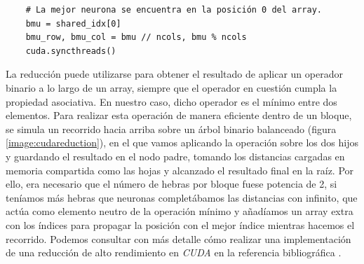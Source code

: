 \begin{code}
\begin{verbatim}
    # La mejor neurona se encuentra en la posición 0 del array.
    bmu = shared_idx[0]
    bmu_row, bmu_col = bmu // ncols, bmu % ncols
    cuda.syncthreads()
\end{verbatim}
\label{code:somiter2}
\end{code}
  
La reducción puede utilizarse para obtener el resultado de aplicar un operador binario a lo largo de un array, siempre que el operador en cuestión cumpla la propiedad asociativa. En nuestro caso, dicho operador es el mínimo entre dos elementos. Para realizar esta operación de manera eficiente dentro de un bloque, se simula un recorrido hacia arriba sobre un árbol binario balanceado (figura \ref{image:cudareduction}), en el que vamos aplicando la operación sobre los dos hijos y guardando el resultado en el nodo padre, tomando los distancias cargadas en memoria compartida como las hojas y alcanzado el resultado final en la raíz. Por ello, era necesario que el número de hebras por bloque fuese potencia de 2, si teníamos más hebras que neuronas completábamos las distancias con infinito, que actúa como elemento neutro de la operación mínimo y añadíamos un array extra con los índices para propagar la posición con el mejor índice mientras hacemos el recorrido. Podemos consultar con más detalle cómo realizar una implementación de una reducción de alto rendimiento en \textit{CUDA} en la referencia bibliográfica \cite{reduction}.\\


